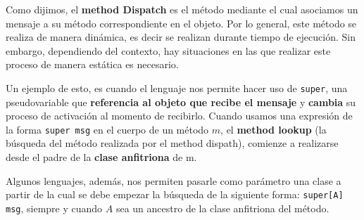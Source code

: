 Como dijimos, el \textbf{method Dispatch} es el método mediante el cual asociamos un mensaje a su método correspondiente en el objeto. Por lo general, este método se realiza de manera dinámica, es decir se realizan durante tiempo de ejecución. Sin embargo, dependiendo del contexto, hay situaciones en las que realizar este proceso de manera estática es necesario. 

Un ejemplo de esto, es cuando el lenguaje nos permite hacer uso de \texttt{super}, una pseudovariable que \textbf{referencia al objeto que recibe el mensaje} y \textbf{cambia} su proceso de activación al momento de recibirlo.
Cuando usamos una expresión de la forma \texttt{super msg} en el cuerpo de un método $m$, el \textbf{method lookup} (la búsqueda del método realizada por el method dispath), comienze a realizarse desde el padre de la \textbf{clase anfitriona} de m.

Algunos lenguajes, además, nos permiten pasarle como parámetro una clase a partir de la cual se debe empezar la búsqueda de la siguiente forma: \texttt{super[A] msg}, siempre y cuando $A$ sea un ancestro de la clase anfitriona del método.